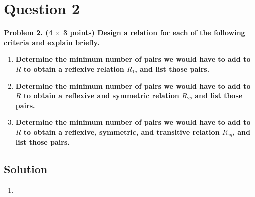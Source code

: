 \documentclass[11pt]{article}
\begin{document}
\clearpage
\section*{Question 2}

    \textbf{Problem 2. (4 $\times$ 3 points) Design a relation for each of the following criteria and explain briefly.}
    \begin{enumerate}[label=(\alph*)]
        \item \textbf{Determine the minimum number of pairs we would have to add to $R$ to obtain a reflexive relation $R_1$, and list those pairs.}
        \item \textbf{Determine the minimum number of pairs we would have to add to $R$ to obtain a reflexive and symmetric relation $R_2$, and list those pairs.}
        \item \textbf{Determine the minimum number of pairs we would have to add to $R$ to obtain a reflexive, symmetric, and transitive relation $R_{eq}$, and list those pairs.}
    \end{enumerate}

    \subsection*{Solution}
    \begin{enumerate}[label=(\alph*)]
        \item
    \end{enumerate}
\end{document}
